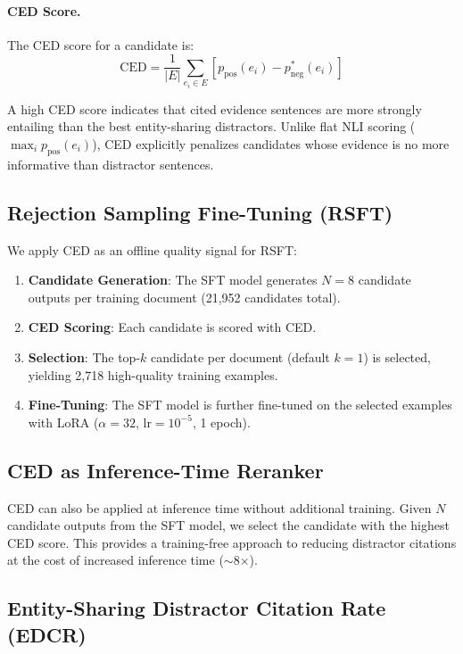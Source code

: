 \documentclass[11pt,a4paper]{article}
\begin{document}
\paragraph{CED Score.} The CED score for a candidate is:
\begin{equation}
    \text{CED} = \frac{1}{|E|} \sum_{e_i \in E} \left[ p_{\text{pos}}(e_i) - p_{\text{neg}}^*(e_i) \right]
\end{equation}

A high CED score indicates that cited evidence sentences are more strongly entailing than the best entity-sharing distractors. Unlike flat NLI scoring ($\max_i p_{\text{pos}}(e_i)$), CED explicitly penalizes candidates whose evidence is no more informative than distractor sentences.

\subsection{Rejection Sampling Fine-Tuning (RSFT)}

We apply CED as an offline quality signal for RSFT:

\begin{enumerate}
    \item \textbf{Candidate Generation}: The SFT model generates $N=8$ candidate outputs per training document (21,952 candidates total).
    \item \textbf{CED Scoring}: Each candidate is scored with CED.
    \item \textbf{Selection}: The top-$k$ candidate per document (default $k{=}1$) is selected, yielding 2,718 high-quality training examples.
    \item \textbf{Fine-Tuning}: The SFT model is further fine-tuned on the selected examples with LoRA ($\alpha{=}32$, lr$=10^{-5}$, 1 epoch).
\end{enumerate}

\subsection{CED as Inference-Time Reranker}

CED can also be applied at inference time without additional training. Given $N$ candidate outputs from the SFT model, we select the candidate with the highest CED score. This provides a training-free approach to reducing distractor citations at the cost of increased inference time ($\sim$8$\times$).

\subsection{Entity-Sharing Distractor Citation Rate (EDCR)}
\end{document}
